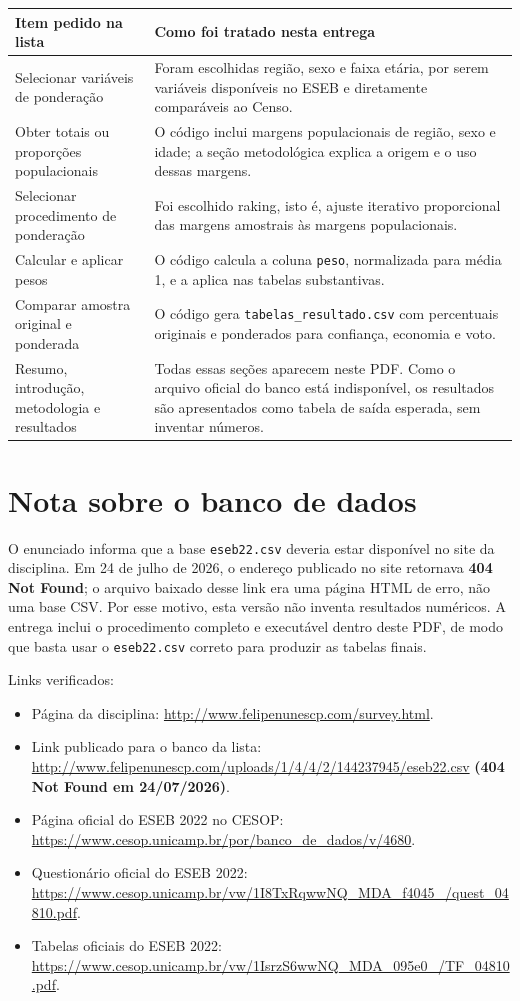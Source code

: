 \documentclass[11pt,a4paper]{article}
\begin{document}
\begin{tabularx}{\textwidth}{p{}X}
\toprule
\textbf{Item pedido na lista} & \textbf{Como foi tratado nesta entrega} \\
\midrule
Selecionar variáveis de ponderação & Foram escolhidas região, sexo e faixa etária, por serem variáveis disponíveis no ESEB e diretamente comparáveis ao Censo. \\
Obter totais ou proporções populacionais & O código inclui margens populacionais de região, sexo e idade; a seção metodológica explica a origem e o uso dessas margens. \\
Selecionar procedimento de ponderação & Foi escolhido raking, isto é, ajuste iterativo proporcional das margens amostrais às margens populacionais. \\
Calcular e aplicar pesos & O código calcula a coluna \texttt{peso}, normalizada para média 1, e a aplica nas tabelas substantivas. \\
Comparar amostra original e ponderada & O código gera \texttt{tabelas\_resultado.csv} com percentuais originais e ponderados para confiança, economia e voto. \\
Resumo, introdução, metodologia e resultados & Todas essas seções aparecem neste PDF. Como o arquivo oficial do banco está indisponível, os resultados são apresentados como tabela de saída esperada, sem inventar números. \\
\bottomrule
\end{tabularx}

\section*{Nota sobre o banco de dados}

O enunciado informa que a base \texttt{eseb22.csv} deveria estar disponível no site da disciplina. Em 24 de julho de 2026, o endereço publicado no site retornava \textbf{404 Not Found}; o arquivo baixado desse link era uma página HTML de erro, não uma base CSV. Por esse motivo, esta versão não inventa resultados numéricos. A entrega inclui o procedimento completo e executável dentro deste PDF, de modo que basta usar o \texttt{eseb22.csv} correto para produzir as tabelas finais.

Links verificados:
\begin{itemize}
\item Página da disciplina: \url{http://www.felipenunescp.com/survey.html}.
\item Link publicado para o banco da lista: \url{http://www.felipenunescp.com/uploads/1/4/4/2/144237945/eseb22.csv} \textbf{(404 Not Found em 24/07/2026)}.
\item Página oficial do ESEB 2022 no CESOP: \url{https://www.cesop.unicamp.br/por/banco_de_dados/v/4680}.
\item Questionário oficial do ESEB 2022: \url{https://www.cesop.unicamp.br/vw/1I8TxRqwwNQ_MDA_f4045_/quest_04810.pdf}.
\item Tabelas oficiais do ESEB 2022: \url{https://www.cesop.unicamp.br/vw/1IsrzS6wwNQ_MDA_095e0_/TF_04810.pdf}.
\end{itemize}
\end{document}
